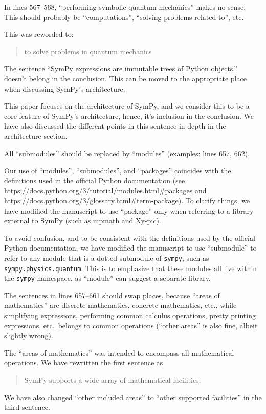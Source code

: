 \documentclass[answers,12pt]{exam}
\begin{document}
\begin{questions}
\question In lines 567--568, ``performing symbolic quantum mechanics'' makes no sense. This should probably be ``computations'', ``solving problems related to'', etc.
\begin{solution}
This was reworded to:
\begin{quote}
to solve problems in quantum mechanics
\end{quote}
\end{solution}

\question The sentence ``SymPy expressions are immutable trees of Python objects.'' doesn't belong in the conclusion. This can be moved to the appropriate place when discussing SymPy's architecture.
\begin{solution}
This paper focuses on the architecture of SymPy, and we consider this to be a
core feature of SymPy's architecture, hence, it's inclusion in the conclusion.
We have also discussed the different points in this sentence in depth in the architecture section.
\end{solution}

\question All ``submodules'' should be replaced by ``modules'' (examples:
lines 657, 662).
\label{rev1point37}
\begin{solution}
  Our use of ``modules'', ``submodules'', and ``packages'' coincides with the
  definitions used in the official Python documentation (see
  \url{https://docs.python.org/3/tutorial/modules.html#packages} and
  \url{https://docs.python.org/3/glossary.html#term-package}). To clarify
  things, we have modified the manuscript to use ``package'' only when
  referring to a library external to SymPy (such as mpmath and Xy-pic).

To avoid confusion, and to be consistent with the definitions used by the
official Python documentation, we have modified the manuscript to use
``submodule'' to refer to any module that is a dotted submodule of
\texttt{sympy}, such as \texttt{sympy.physics.quantum}. This is to emphasize
that these modules all live within the \texttt{sympy} namespace, as ``module''
can suggest a separate library.
\end{solution}

\question The sentences in lines 657--661 should swap places, because ``areas of mathematics'' are discrete mathematics, concrete mathematics, etc., while simplifying expressions, performing common calculus operations, pretty printing expressions, etc.\ belongs to common operations (``other areas'' is also fine, albeit slightly wrong).
\begin{solution}
The ``areas of mathematics'' was intended to encompass all mathematical
operations. We have rewritten the first sentence as
\begin{quote}
SymPy supports a wide array of mathematical facilities.
\end{quote}
We have also changed ``other included areas'' to ``other supported facilities'' in the third sentence.


\end{solution}
\end{questions}
\end{document}

